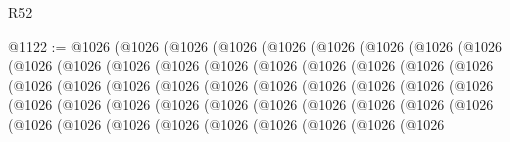 \begin{lexlean}{R52}
\begin{coremodule}
@1122 := @1026
    (@1026
      (@1026
        (@1026
          (@1026
            (@1026
              (@1026
                (@1026
                  (@1026
                    (@1026
                      (@1026
                        (@1026
                          (@1026
                            (@1026
                              (@1026
                                (@1026
                                  (@1026
                                    (@1026
                                      (@1026
                                        (@1026
                                          (@1026
                                            (@1026
                                              (@1026
                                                (@1026
                                                  (@1026
                                                    (@1026
                                                      (@1026
                                                        (@1026
                                                          (@1026
                                                            (@1026
                                                              (@1026
                                                                (@1026
                                                                  (@1026
                                                                    (@1026
                                                                      (@1026
                                                                        (@1026
                                                                          (@1026
                                                                            (@1026
                                                                              (@1026
                                                                                (@1026
                                                                                  (@1026
                                                                                    (@1026
                                                                                      (@1026
                                                                                        (@1026
                                                                                          (@1026
                                                                                            (@1026
                                                                                              (@1026
                                                                                                (@1026

\end{coremodule}
\end{lexlean}
